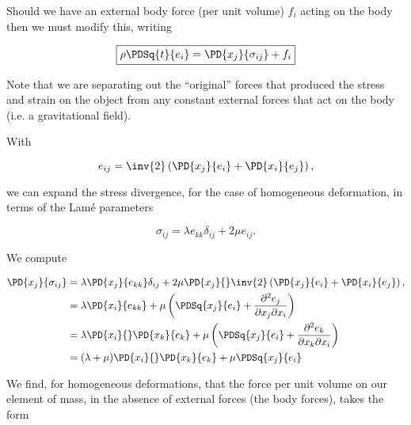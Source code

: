 Should we have an external body force (per unit volume) $f_i$ acting on the body then we must modify this, writing

\begin{equation}\label{eqn:continuumL6:170}
\boxed{
\rho \PDSq{t}{e_i} = \PD{x_j}{\sigma_{ij}} + f_i
}
\end{equation}

Note that we are separating out the ``original'' forces that produced the stress and strain on the object from any constant external forces that act on the body (i.e. a gravitational field).

With 

\begin{equation}\label{eqn:continuumL6:190}
e_{ij} = 
\inv{2} \left( 
\PD{x_j}{e_i}
+ \PD{x_i}{e_j} \right),
\end{equation}

we can expand the stress divergence, for the case of homogeneous deformation, in terms of the Lam\'e parameters

\begin{equation}\label{eqn:continuumL6:210}
\sigma_{ij} = \lambda e_{kk} \delta_{ij} + 2 \mu e_{ij}.
\end{equation}

We compute

\begin{align*}
\PD{x_j}{\sigma_{ij}}
&=
\lambda 
\PD{x_j}{
e_{kk}
}
\delta_{ij} + 2 \mu 
\PD{x_j}{
}
\inv{2} \left( 
\PD{x_j}{e_i}
+ \PD{x_i}{e_j} \right),
 \\
&=
\lambda 
\PD{x_i}{
e_{kk}
}
+ \mu 
\left(
\PDSq{x_j}{
e_{i}
}
+
\frac{\partial^2 e_{j} }{ \partial x_j \partial x_i}
\right) \\
&=
\lambda 
\PD{x_i}{
}
\PD{x_k}{e_k}
+ \mu 
\left(
\PDSq{x_j}{
e_{i}
}
+
\frac{\partial^2 e_{k} }{ \partial x_k \partial x_i}
\right) \\
&=
(\lambda + \mu)
\PD{x_i}{
}
\PD{x_k}{e_k}
+ \mu 
\PDSq{x_j}{
e_{i}
}
\end{align*}

%
%
We find, for homogeneous deformations, that the force per unit volume on our element of mass, in the absence of external forces (the body forces), takes the form
%

